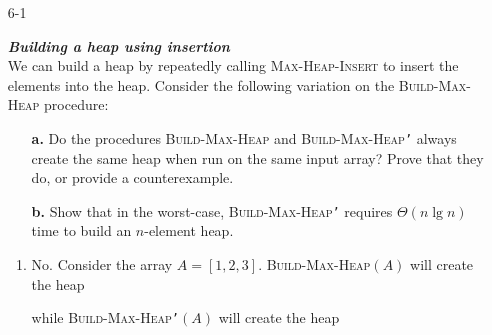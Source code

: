 \documentclass{report}
\makeatletter
\renewenvironment{framed}{%
 \def\FrameCommand##1{\hskip\@totalleftmargin
 \fboxsep=\FrameSep\fbox{##1}}%
 \MakeFramed {\advance\hsize-\width
   \@totalleftmargin\z@ \linewidth\hsize
   \@setminipage}}%
 {\par\unskip\endMakeFramed}
\makeatother
\begin{document}
\begin{enumerate}


\item[6{-}1]{\textbf{\emph{Building a heap using insertion}}\\
We can build a heap by repeatedly calling \textsc{Max-Heap-Insert} to insert
the elements into the heap. Consider the following variation on the
\textsc{Build-Max-Heap} procedure:

\begin{algorithm}[H]
\SetAlgoNoEnd\DontPrintSemicolon
\BlankLine
{}
\end{algorithm}

\begin{enumerate}
\item[\textbf{a.}]{Do the procedures \textsc{Build-Max-Heap} and
\textsc{Build-Max-Heap\texttt{'}} always create the same heap when run on the
same input array? Prove that they do, or provide a counterexample.}
\item[\textbf{b.}]{Show that in the worst-case,
\textsc{Build-Max-Heap\texttt{'}} requires $\Theta(n \lg n)$ time to build an
$n$-element heap.}
\end{enumerate}

}

\begin{framed}
\begin{enumerate}

\item No. Consider the array $A = [1, 2, 3]$. \textsc{Build-Max-Heap}$(A)$ will
create the heap
\begin{center}
\end{center}

while \textsc{Build-Max-Heap\texttt{'}}$(A)$ will create the heap

\begin{center}
\end{center}


\end{enumerate}
\end{framed}
\end{enumerate}
\end{document}

